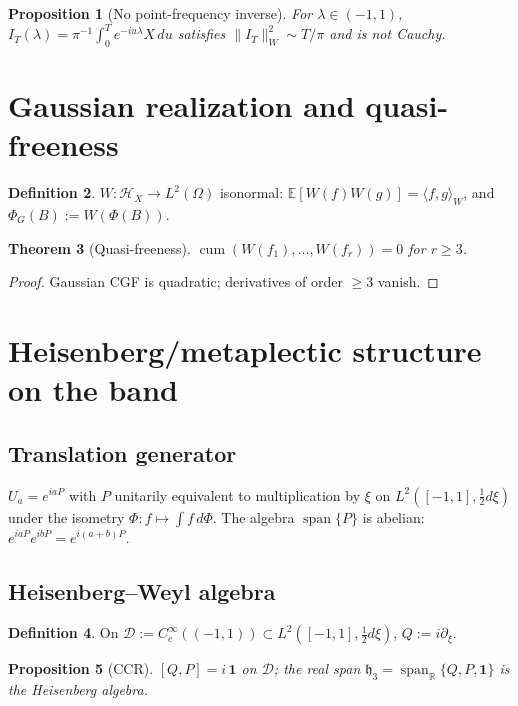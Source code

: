\documentclass[11pt,reqno]{amsart}
\theoremstyle{plain}
\newtheorem{theorem}{Theorem}[section]
\newtheorem{proposition}[theorem]{Proposition}
\theoremstyle{definition}
\newtheorem{definition}[theorem]{Definition}
\theoremstyle{remark}
\DeclareMathOperator{\cum}{cum}
\DeclareMathOperator{\spanop}{span}
\newcommand{\Hc}{\mathcal H}
\newcommand{\Dc}{\mathcal D}
\newcommand{\R}{\mathbb R}
\newcommand{\E}{\mathbb E}
\newcommand{\hh}{\mathfrak h}
\begin{document}
\begin{proposition}[No point-frequency inverse]\label{prop:nopoint}
For \(\lambda\in(-1,1)\), \(I_T(\lambda)=\pi^{-1}\int_0^T e^{-iu\lambda}X\,du\)
satisfies \(\|I_T\|_W^2\sim T/\pi\) and is not Cauchy.
\end{proposition}

\section{Gaussian realization and quasi-freeness}

\begin{definition}
\(W:\Hc_X\to L^2(\Omega)\) isonormal: \(\E[W(f)W(g)]=\langle f,g\rangle_W\),
and \(\Phi_G(B):=W(\Phi(B))\).
\end{definition}

\begin{theorem}[Quasi-freeness]\label{thm:quasifree}
\(\cum(W(f_1),\ldots,W(f_r))=0\) for \(r\ge3\).
\end{theorem}

\begin{proof}
Gaussian CGF is quadratic; derivatives of order \(\ge3\) vanish.
\end{proof}

\section{Heisenberg/metaplectic structure on the band}

\subsection{Translation generator}

\(U_a=e^{iaP}\) with \(P\) unitarily equivalent to multiplication by
\(\xi\) on \(L^2([-1,1],\tfrac12 d\xi)\) under the isometry
\(\Phi\colon f\mapsto\int f\,d\Phi\). The algebra \(\spanop\{P\}\) is
abelian: \(e^{iaP}e^{ibP}=e^{i(a+b)P}\).

\subsection{Heisenberg--Weyl algebra}

\begin{definition}
On \(\Dc:=C^\infty_c((-1,1))\subset L^2([-1,1],\tfrac12 d\xi)\),
\(Q:=i\partial_\xi\).
\end{definition}

\begin{proposition}[CCR]\label{prop:ccr}
\([Q,P]=i\,\mathbf 1\) on \(\Dc\); the real span
\(\hh_3=\spanop_{\R}\{Q,P,\mathbf 1\}\) is the Heisenberg algebra.
\end{proposition}
\end{document}
